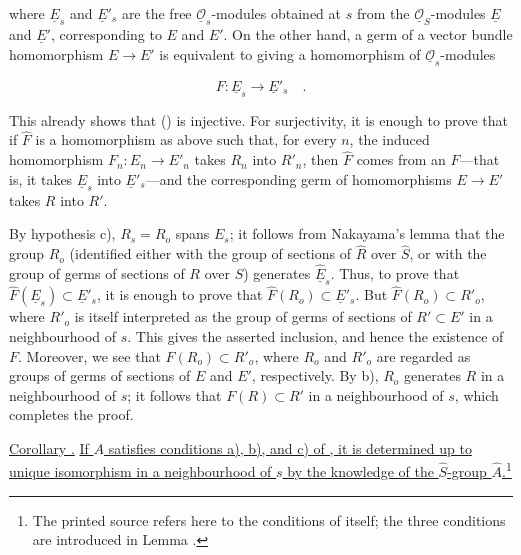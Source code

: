 \noindent
where $\underline E_s$ and $\underline E'_s$ are the free
$\underline{\mathcal O}_s$-modules obtained at $s$ from the
$\underline{\mathcal O}_S$-modules $\underline E$ and $\underline E'$,
corresponding to $E$ and $E'$. On the other hand, a germ of a vector
bundle homomorphism $E\longrightarrow E'$ is equivalent to giving a
homomorphism of $\underline{\mathcal O}_s$-modules

\begin{equation*}
 F:\underline E_s\longrightarrow\underline E'_s\quad .
\end{equation*}

\noindent
This already shows that () is injective. For surjectivity, it is
enough to prove that if $\widehat F$ is a homomorphism as above such that,
for every $n$, the induced homomorphism
$F_n:E_n\longrightarrow E'_n$ takes $R_n$ into $R'_n$, then
$\widehat F$ comes from an $F$---that is, it takes $\underline E_s$ into
$\underline E'_s$---and the corresponding germ of homomorphisms
$E\longrightarrow E'$ takes $R$ into $R'$.

By hypothesis c), $R_s=R_o$ spans $E_s$; it follows from Nakayama's
lemma that the group $R_o$ (identified either with the group of sections
of $\widehat R$ over $\widehat S$, or with the group of germs of sections
of $R$ over $S$) generates $\widehat{\underline E}_s$. Thus, to prove that
$\widehat F(\underline E_s)\subset\underline E'_s$, it is enough to prove
that $\widehat F(R_o)\subset\underline E'_s$. But
$\widehat F(R_o)\subset R'_o$, where $R'_o$ is itself interpreted as the
group of germs of sections of $R'\subset E'$ in a neighbourhood of $s$.
This gives the asserted inclusion, and hence the existence of $F$.
Moreover, we see that $F(R_o)\subset R'_o$, where $R_o$ and $R'_o$ are
regarded as groups of germs of sections of $E$ and $E'$, respectively.
By b), $R_o$ generates $R$ in a neighbourhood of $s$; it follows that
$F(R)\subset R'$ in a neighbourhood of $s$, which completes the proof.

\medskip
\noindent
\underline{Corollary .} \underline{If $A$ satisfies conditions
a), b), and c) of , it is determined up to unique isomorphism in a
neighbourhood of $s$ by the knowledge of the $\widehat S$-group
$\widehat A$.}\footnote{The printed source refers here to the conditions
of  itself; the three conditions are introduced in Lemma .}
